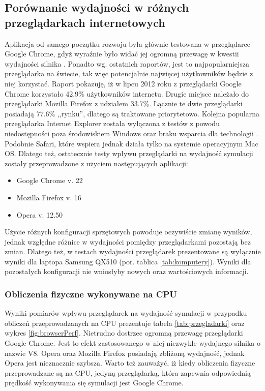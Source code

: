 \subsection{Porównanie wydajności w różnych przeglądarkach internetowych}
\label{sec:przegladarkiWyd}

Aplikacja od samego początku rozwoju była głównie testowana w przeglądarce
Google Chrome, gdyż wyraźnie było widać jej ogromną przewagę w kwestii
wydajności silnika \js. Ponadto wg. ostatnich raportów, jest to
najpopularniejsza przeglądarka na świecie, tak więc potencjalnie najwięcej
użytkowników \en będzie z niej korzystać. Raport \cite{BrowserStats} pokazuję,
iż w lipcu 2012 roku z przeglądarki Google Chrome korzystało 42.9\%
użytkowników internetu. Drugie miejsce należało do przeglądarki Mozilla
Firefox z udziałem 33.7\%. Łącznie te dwie przeglądarki posiadają 77.6\%
,,rynku'', dlatego są traktowane priorytetowo. Kolejna popularna przeglądarka
Internet Explorer została wyłączona z testów z powodu niedostępności poza
środowiskiem Windows oraz braku wsparcia dla technologii . Podobnie
Safari, które wspiera  jednak działa tylko na systemie operacyjnym
Mac OS. Dlatego też, ostatecznie testy wpływu przeglądarki na wydajność
symulacji zostały przeprowadzone z użyciem następujących aplikacji:

\begin{itemize}
\item Google Chrome v. 22
\item Mozilla Firefox v. 16
\item Opera v. 12.50
\end{itemize}

Użycie różnych konfiguracji sprzętowych powoduje oczywiście zmianę wyników,
jednak względne różnice w wydajności pomiędzy przeglądarkami pozostają bez
zmian. Dlatego też, w testach wydajności przeglądarek prezentowane są
wyłącznie wyniki dla laptopa Samsung QX510 (por. tablica \ref{tab:komputery}).
Wyniki dla pozostałych konfiguracji nie wniosłyby nowych oraz wartościowych
informacji.

\subsubsection{Obliczenia fizyczne wykonywane na CPU}

Wyniki pomiarów wpływu przeglądarek na wydajność symulacji w przypadku
obliczeń przeprowadzanych na CPU prezentuje tabela \ref{tab:przegladarki} oraz
wykres \ref{fig:browserPerf}. Nietrudno dostrzec ogromną przewagę przeglądarki
Google Chrome. Jest to efekt zastosowanego w niej niezwykle wydajnego silnika
 o nazwie V8. Opera oraz Mozilla Firefox posiadają zbliżoną
wydajność, jednak Opera jest nieznacznie szybsza. Warto też zauważyć, iż kiedy
obliczenia fizyczne przeprowadzane są na CPU, jedyną przeglądarką, która
zapewnia odpowiednią prędkość wykonywania się symulacji jest Google Chrome.

